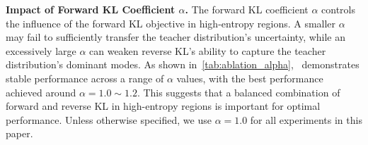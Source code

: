 \textbf{Impact of Forward KL Coefficient $\alpha$.}
The forward KL coefficient $\alpha$ controls the influence of the forward KL objective in high-entropy regions. A smaller $\alpha$ may fail to sufficiently transfer the teacher distribution’s uncertainty, while an excessively large $\alpha$ can weaken reverse KL’s ability to capture the teacher distribution’s dominant modes.
As shown in~\autoref{tab:ablation_alpha}, \method~demonstrates stable performance across a range of $\alpha$ values, with the best performance achieved around $\alpha = 1.0 \sim 1.2$. This suggests that a balanced combination of forward and reverse KL in high-entropy regions is important for optimal performance. Unless otherwise specified, we use $\alpha = 1.0$ for all experiments in this paper.
\begin{table}[ht]
\centering
\caption{
Impact of the forward KL coefficient $\alpha$ for the Qwen3-1.7B-Base student. \textbf{Bold} indicates the best performance and \underline{underline} indicates second-best.
}
\label{tab:ablation_alpha}
\end{table}

